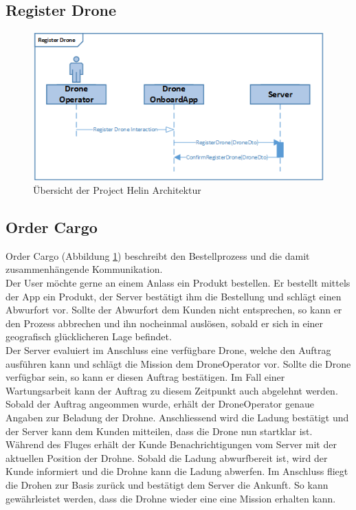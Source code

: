 \subsection{Register Drone}
\begin{figure}[h]
	\centering
	\includegraphics[scale=1.0]{images/registerDrone.png}
	\caption{Übersicht der Project Helin Architektur }
	\label{fig:registerDrone}
\end{figure}
%
\subsection{Order Cargo}

Order Cargo (Abbildung \ref{fig:registerDrone}) beschreibt den Bestellprozess und die damit zusammenhängende Kommunikation. \\
Der User möchte gerne an einem Anlass ein Produkt bestellen. Er bestellt mittels der App ein Produkt, der Server bestätigt ihm die Bestellung und schlägt einen Abwurfort vor. Sollte der Abwurfort dem Kunden nicht entsprechen, so kann er den Prozess abbrechen und ihn nocheinmal auslösen, sobald er sich in einer geografisch glücklicheren Lage befindet.
\\
Der Server evaluiert im Anschluss eine verfügbare Drone, welche den Auftrag ausführen kann und schlägt die Mission dem DroneOperator vor. Sollte die Drone verfügbar sein, so kann er diesen Auftrag bestätigen. Im Fall einer Wartungsarbeit kann der Auftrag zu diesem Zeitpunkt auch abgelehnt werden. Sobald der Auftrag angeommen wurde, erhält der DroneOperator genaue Angaben zur Beladung der Drohne. Anschliessend wird die Ladung bestätigt und der Server kann dem Kunden mitteilen, dass die Drone nun startklar ist. Während des Fluges erhält der Kunde Benachrichtigungen vom Server mit der aktuellen Position der Drohne. Sobald die Ladung abwurfbereit ist, wird der Kunde informiert und die Drohne kann die Ladung abwerfen. Im Anschluss fliegt die Drohen zur Basis zurück und bestätigt dem Server die Ankunft. So kann gewährleistet werden, dass die Drohne wieder eine eine Mission erhalten kann.
%